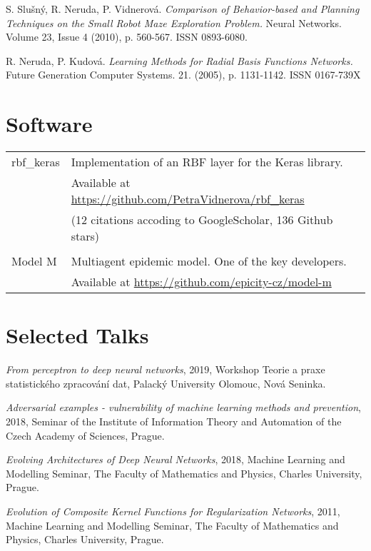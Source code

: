 \documentclass[a4paper, oneside, final]{scrartcl} %
\begin{document}
\noindent
S. Slu\v{s}n\'y, R. Neruda, P. Vidnerov\'a.  {\em Comparison of
  Behavior-based and Planning Techniques on the Small Robot Maze
  Exploration Problem.}  Neural Networks. Volume 23, Issue 4 (2010),
p. 560-567. ISSN 0893-6080.

\noindent
R. Neruda, P. Kudov\'a.  {\em Learning Methods for Radial Basis
  Functions Networks.}  Future Generation Computer
Systems. 21. (2005), p. 1131-1142. ISSN 0167-739X

\section{Software}
\begin{tabularx}{0.97\linewidth}{>{\raggedleft}p{2cm}X}
  rbf\_keras & Implementation of an RBF layer for the Keras library. \\
   & Available at
  \href{https://github.com/PetraVidnerova/rbf_keras}{https://github.com/PetraVidnerova/rbf\_keras}\\
  & (12 citations accoding to GoogleScholar, 136 Github stars)\\
&  \\
  Model M & Multiagent epidemic model. One of the key developers. \\
  & Available at
  \href{https://github.com/epicity-cz/model-m}{https://github.com/epicity-cz/model-m} 

\end{tabularx}

\section{Selected Talks}
    {\em From perceptron to deep neural networks}, 2019,
    Workshop Teorie a praxe statistického zpracování dat,
    Palacký University Olomouc,  Nová Seninka.

\noindent
    {\em Adversarial examples - vulnerability of machine learning
      methods and prevention}, 2018, Seminar of the Institute of
    Information Theory and Automation of the Czech Academy of
    Sciences, Prague.

\noindent
    {\em Evolving Architectures of Deep Neural Networks}, 2018,
 Machine Learning and Modelling Seminar, The Faculty
of Mathematics and Physics, Charles University, Prague.

\noindent
{\em Evolution of Composite Kernel Functions for Regularization
  Networks}, 2011, Machine Learning and Modelling Seminar, The Faculty
of Mathematics and Physics, Charles University, Prague.
\end{document}
